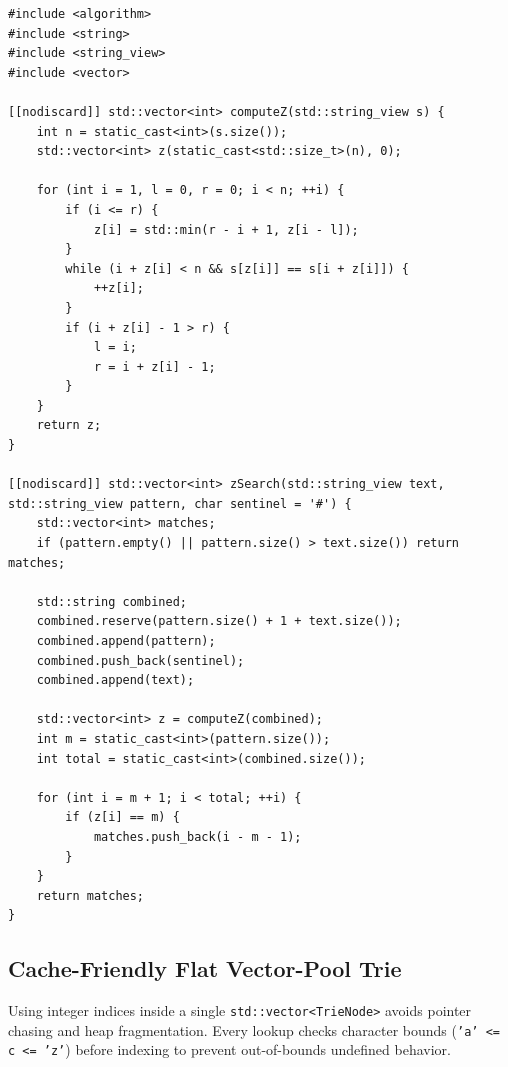 \documentclass[11pt,a4paper]{article}
\theoremstyle{definition}
\begin{document}
\begin{lstlisting}[caption={Linear-Time Z-Array and Sentinel-Based Pattern Search}]
#include <algorithm>
#include <string>
#include <string_view>
#include <vector>

[[nodiscard]] std::vector<int> computeZ(std::string_view s) {
    int n = static_cast<int>(s.size());
    std::vector<int> z(static_cast<std::size_t>(n), 0);

    for (int i = 1, l = 0, r = 0; i < n; ++i) {
        if (i <= r) {
            z[i] = std::min(r - i + 1, z[i - l]);
        }
        while (i + z[i] < n && s[z[i]] == s[i + z[i]]) {
            ++z[i];
        }
        if (i + z[i] - 1 > r) {
            l = i;
            r = i + z[i] - 1;
        }
    }
    return z;
}

[[nodiscard]] std::vector<int> zSearch(std::string_view text, std::string_view pattern, char sentinel = '#') {
    std::vector<int> matches;
    if (pattern.empty() || pattern.size() > text.size()) return matches;

    std::string combined;
    combined.reserve(pattern.size() + 1 + text.size());
    combined.append(pattern);
    combined.push_back(sentinel);
    combined.append(text);

    std::vector<int> z = computeZ(combined);
    int m = static_cast<int>(pattern.size());
    int total = static_cast<int>(combined.size());

    for (int i = m + 1; i < total; ++i) {
        if (z[i] == m) {
            matches.push_back(i - m - 1);
        }
    }
    return matches;
}
\end{lstlisting}

\subsection{Cache-Friendly Flat Vector-Pool Trie}

Using integer indices inside a single \texttt{std::vector<TrieNode>} avoids pointer chasing and heap fragmentation. Every lookup checks character bounds (\texttt{'a' <= c <= 'z'}) before indexing to prevent out-of-bounds undefined behavior.
\end{document}
